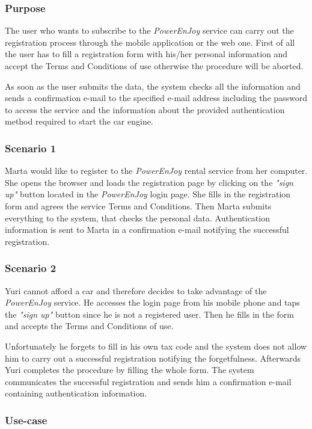 \subsubsection{Purpose}
The user who wants to subscribe to the \emph{PowerEnJoy} service can carry out the registration process through the mobile application or the web one. First of all the user has to fill a registration form with his/her personal information and accept the Terms and Conditions of use otherwise the procedure will be aborted.

As soon as the user submits the data, the system checks all the information and sends a confirmation e-mail to the specified e-mail address including the password to access the service and the information about the provided authentication method required to start the car engine.

\subsubsection{Scenario 1}
Marta would like to register to the \emph{PowerEnJoy} rental service from her computer. She opens the browser and loads the registration page by clicking on the \emph{"sign up"} button located in the \emph{PowerEnJoy} login page. She fills in the registration form and agrees the service Terms and Conditions. Then Marta submits everything to the system, that checks the personal data. Authentication information is sent to Marta in a confirmation e-mail notifying the successful registration.

\subsubsection{Scenario 2}
Yuri cannot afford a car and therefore decides to take advantage of the \emph{PowerEnJoy} service. He accesses the login page from his mobile phone and taps the \emph{"sign up"} button since he is not a registered user. Then he fills in the form and accepts the Terms and Conditions of use.

Unfortunately he forgets to fill in his own tax code and the system does not allow him to carry out a successful registration notifying the forgetfulness. Afterwards Yuri completes the procedure by filling the whole form. The system communicates the successful registration and sends him a confirmation e-mail containing authentication information.

\subsubsection{Use-case}


